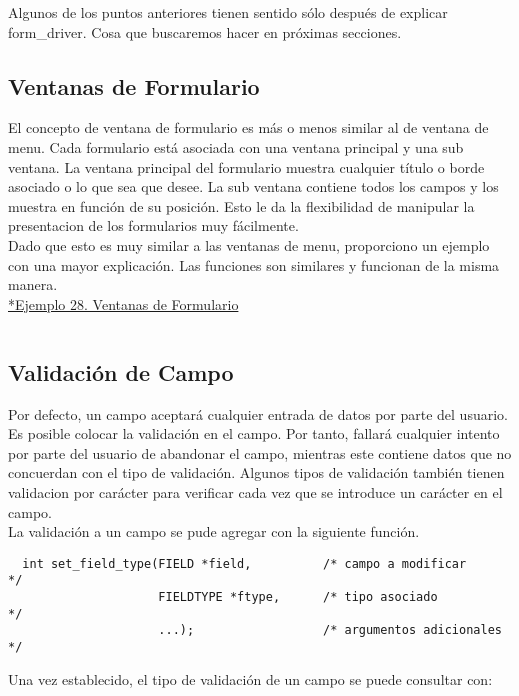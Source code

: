 \documentclass{article}
\begin{document}
Algunos de los puntos anteriores tienen sentido sólo después de explicar
form\_driver. Cosa que buscaremos hacer en próximas secciones.

\subsection{Ventanas de Formulario}%
El concepto de ventana de formulario es más o menos similar al de ventana de
menu. Cada formulario está asociada con una ventana principal y una sub
ventana. La ventana principal del formulario muestra cualquier título o borde
asociado o lo que sea que desee. La sub ventana contiene todos los campos y los
muestra en función de su posición. Esto le da la flexibilidad de manipular la
presentacion de los formularios muy fácilmente.\\

Dado que esto es muy similar a las ventanas de menu, proporciono un ejemplo con
una mayor explicación. Las funciones son similares y funcionan de la misma
manera.\\

\href{https://github.com/nasciiboy/NCURSES-Programming-HOWTO/blob/master/ncurses_programs/forms/form_win.c}{*Ejemplo 28. Ventanas de Formulario}
\inputminted{cpp}{./cpp/028_ventanas_formulario.cpp}

\subsection{Validación de Campo}%
Por defecto, un campo aceptará cualquier entrada de datos por parte del
usuario. Es posible colocar la validación en el campo. Por tanto, fallará
cualquier intento por parte del usuario de abandonar el campo, mientras este
contiene datos que no concuerdan con el tipo de validación. Algunos tipos de
validación también tienen validacion por carácter para verificar cada vez que
se introduce un carácter en el campo.\\

La validación a un campo se pude agregar con la siguiente función.

\begin{verbatim}
  int set_field_type(FIELD *field,          /* campo a modificar      */
                     FIELDTYPE *ftype,      /* tipo asociado          */
                     ...);                  /* argumentos adicionales */
\end{verbatim}

Una vez establecido, el tipo de validación de un campo se puede consultar con:
\end{document}
